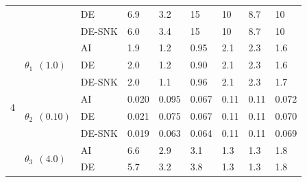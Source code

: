 \begin{table}[ht]
\begin{tabularx}{\textwidth}{lllXXXXXX}
& & DE & 6.9 \cellcolor[HTML]{4EA600} & 3.2 \cellcolor[HTML]{F0F700} & 15 \cellcolor[HTML]{50A700} & 10 \cellcolor[HTML]{048100} & 8.7 \cellcolor[HTML]{1C8D00} & 10 \cellcolor[HTML]{028000} \\
& & DE-SNK & 6.0 \cellcolor[HTML]{6CB500} & 3.4 \cellcolor[HTML]{E2F000} & 15 \cellcolor[HTML]{56AA00} & 10 \cellcolor[HTML]{028000} & 8.7 \cellcolor[HTML]{1E8E00} & 10 \cellcolor[HTML]{088300} \\
\cmidrule(lr){1-3} \cmidrule(lr){4-6} \cmidrule(lr){7-9}
\multirow{15}{*}{4} & \multirow{3}{*}{$\theta_1 \:\: (1.0)$} & AI & 1.9 \cellcolor[HTML]{83C100} & 1.2 \cellcolor[HTML]{2C9500} & 0.95 \cellcolor[HTML]{0A8400} & 2.1 \cellcolor[HTML]{98CB00} & 2.3 \cellcolor[HTML]{B0D700} & 1.6 \cellcolor[HTML]{64B100} \\
& & DE & 2.0 \cellcolor[HTML]{8CC500} & 1.2 \cellcolor[HTML]{269200} & 0.90 \cellcolor[HTML]{148900} & 2.1 \cellcolor[HTML]{96CA00} & 2.3 \cellcolor[HTML]{B0D700} & 1.6 \cellcolor[HTML]{68B300} \\
& & DE-SNK & 2.0 \cellcolor[HTML]{90C700} & 1.1 \cellcolor[HTML]{148900} & 0.96 \cellcolor[HTML]{068200} & 2.1 \cellcolor[HTML]{98CB00} & 2.3 \cellcolor[HTML]{B2D800} & 1.7 \cellcolor[HTML]{69B400} \\
\cmidrule(lr){4-6} \cmidrule(lr){7-9}
& \multirow{3}{*}{$\theta_2 \:\: (0.10)$} & AI & 0.020 \cellcolor[HTML]{FFB000} & 0.095 \cellcolor[HTML]{0A8400} & 0.067 \cellcolor[HTML]{54A900} & 0.11 \cellcolor[HTML]{0E8600} & 0.11 \cellcolor[HTML]{108700} & 0.072 \cellcolor[HTML]{46A200} \\
& & DE & 0.021 \cellcolor[HTML]{FFB200} & 0.075 \cellcolor[HTML]{3C9D00} & 0.067 \cellcolor[HTML]{54A900} & 0.11 \cellcolor[HTML]{0E8600} & 0.11 \cellcolor[HTML]{108700} & 0.070 \cellcolor[HTML]{49A400} \\
& & DE-SNK & 0.019 \cellcolor[HTML]{FFA200} & 0.063 \cellcolor[HTML]{60AF00} & 0.064 \cellcolor[HTML]{5CAD00} & 0.11 \cellcolor[HTML]{0E8600} & 0.11 \cellcolor[HTML]{128800} & 0.069 \cellcolor[HTML]{4CA500} \\
\cmidrule(lr){4-6} \cmidrule(lr){7-9}
& \multirow{3}{*}{$\theta_3 \:\: (4.0)$} & AI & 6.6 \cellcolor[HTML]{68B300} & 2.9 \cellcolor[HTML]{41A000} & 3.1 \cellcolor[HTML]{389B00} & 1.3 \cellcolor[HTML]{EEF600} & 1.3 \cellcolor[HTML]{EAF400} & 1.8 \cellcolor[HTML]{A8D300} \\
& & DE & 5.7 \cellcolor[HTML]{49A400} & 3.2 \cellcolor[HTML]{2A9400} & 3.8 \cellcolor[HTML]{0A8400} & 1.3 \cellcolor[HTML]{EEF600} & 1.3 \cellcolor[HTML]{EAF400} & 1.8 \cellcolor[HTML]{ACD500} \\

\end{tabularx}
\end{table}
